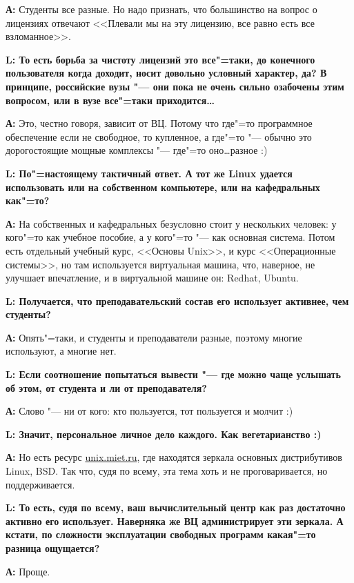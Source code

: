 \documentclass[10pt, a5paper]{article}
\begin{document}
{\noindent \bf А:} Студенты все разные. Но надо признать, что большинство на вопрос о лицензиях отвечают <<Плевали мы на эту лицензию, все равно есть все взломанное>>. 

{\noindent \bf L: То есть борьба за чистоту лицензий это все"=таки, до конечного пользователя когда доходит, носит довольно условный характер, да? В принципе, российские вузы "--- они пока не очень сильно озабочены этим вопросом, или в вузе все"=таки приходится\ldots}

{\noindent \bf А:} Это, честно говоря, зависит от ВЦ. Потому что где"=то программное обеспечение если не свободное, то купленное, а где"=то "--- обычно это дорогостоящие мощные комплексы "--- где"=то оно\ldots разное :)

{\noindent \bf L: По"=настоящему тактичный ответ. А тот же Linux удается использовать или на собственном компьютере, или на кафедральных как"=то?}

{\noindent \bf А:} На собственных и кафедральных безусловно стоит у нескольких человек: у кого"=то как учебное пособие, а у кого"=то "--- как основная система. Потом есть отдельный учебный курс, <<Основы Unix>>, и курс <<Операционные системы>>, но там используется виртуальная машина, что, наверное, не улучшает впечатление, и в виртуальной машине он: Redhat, Ubuntu.

{\noindent \bf L: Получается, что преподавательский состав его использует активнее, чем студенты?}

{\noindent \bf А:} Опять"=таки, и студенты и преподаватели разные, поэтому многие используют, а многие нет.

{\noindent \bf L: Если соотношение попытаться вывести "--- где можно чаще услышать об этом, от студента и ли от преподавателя?}

{\noindent \bf А:} Слово "--- ни от кого: кто пользуется, тот пользуется и молчит :)

{\noindent \bf L: Значит, персональное личное дело каждого. Как вегетарианство :)}

{\noindent \bf А:} Но есть ресурс \url{unix.miet.ru}, где находятся зеркала основных дистрибутивов Linux, BSD. Так что, судя по всему, эта тема хоть и не проговаривается, но поддерживается.

{\noindent \bf L: То есть, судя по всему, ваш вычислительный центр как раз достаточно активно его использует. Наверняка же ВЦ администрирует эти зеркала. А кстати, по сложности эксплуатации свободных программ какая"=то разница ощущается?}

{\noindent \bf А:} Проще.
\end{document}
